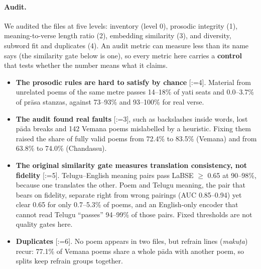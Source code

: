 \documentclass[11pt]{article}
\makeatletter
\DeclareRobustCommand{\exref}[1]{{\scriptsize[\def\ex@sep{}\@for\ex@i:=#1\do{\ex@sep
  \expandafter\ex@item\expandafter{\ex@i}\def\ex@sep{, }}]}}
\newcommand{\ex@item}[1]{\in@{-}{#1}\ifin@\ex@range#1\@nil\else\ex@link{#1}\fi}
\def\ex@range#1-#2\@nil{\ex@link{#1}--\ex@link{#2}}
\newcommand{\ex@link}[1]{\hyperref[exp:E#1]{E#1}}
\makeatother
\begin{document}
\paragraph{Audit.} We audited the files at five levels: inventory (level 0), prosodic integrity (1),
meaning-to-verse length ratio (2), embedding similarity (3), and diversity, subword fit and duplicates (4).
An audit metric can measure less than its name says (the similarity gate below is one), so every metric here
carries a \textbf{control} that tests whether the number means what it claims.
\begin{itemize}
\item \textbf{The prosodic rules are hard to satisfy by chance} \exref{4}. Material from unrelated poems of the same
  metre passes 14--18\% of yati seats and 0.0--3.7\% of prāsa stanzas, against 73--93\% and 93--100\% for
  real verse.
\item \textbf{The audit found real faults} \exref{3}, such as backslashes inside words, lost pāda breaks and 142
  Vemana poems mislabelled by a heuristic. Fixing them raised the share of fully valid poems from 72.4\% to
  83.5\% (Vemana) and from 63.8\% to 74.0\% (Chandassu).
\item \textbf{The original similarity gate measures translation consistency, not fidelity} \exref{5}. Telugu--English
  meaning pairs pass LaBSE $\geq$ 0.65 \citep{feng2022labse} at 90--98\%, because one translates the other.
  Poem and Telugu meaning, the pair that bears on fidelity, separate right from wrong pairings (AUC
  0.85--0.94) yet clear 0.65 for only 0.7--5.3\% of poems, and an English-only encoder that cannot read
  Telugu ``passes'' 94--99\% of those pairs. Fixed thresholds are not quality gates here.
\item \textbf{Duplicates} \exref{6}. No poem appears in two files, but refrain lines (\textit{makuṭa}) recur: 77.1\% of
  Vemana poems share a whole pāda with another poem, so splits keep refrain groups together.
\end{itemize}
\end{document}
